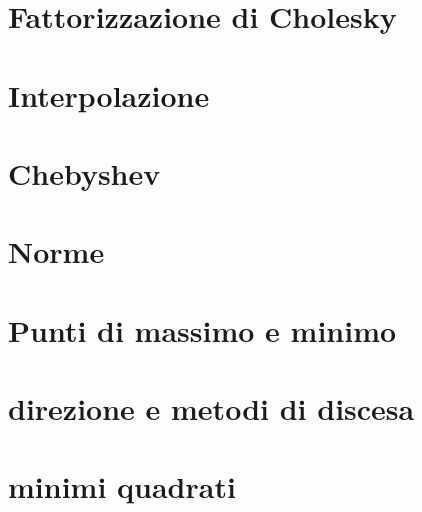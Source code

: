 \documentclass{article}
\begin{document}
	\section{Fattorizzazione di Cholesky}
	\section{Interpolazione}
	\section{Chebyshev}
	\section{Norme}
	\section{Punti di massimo e minimo}
	\section{direzione e metodi di discesa}
	\section{minimi quadrati}
\end{document}
